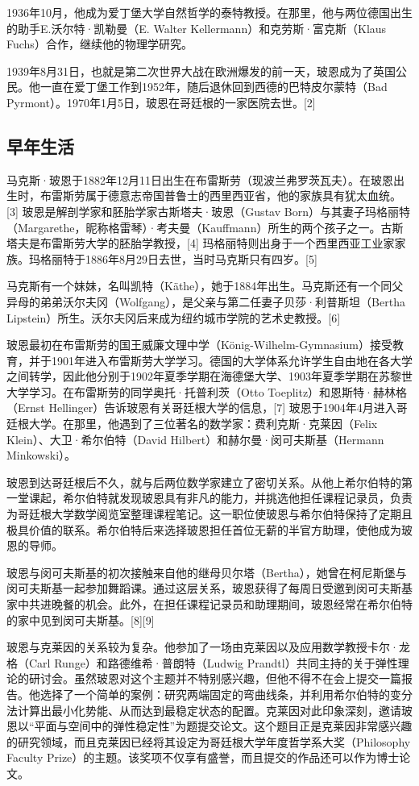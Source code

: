 1936年10月，他成为爱丁堡大学自然哲学的泰特教授。在那里，他与两位德国出生的助手E.沃尔特·凯勒曼（E. Walter Kellermann）和克劳斯·富克斯（Klaus Fuchs）合作，继续他的物理学研究。

1939年8月31日，也就是第二次世界大战在欧洲爆发的前一天，玻恩成为了英国公民。他一直在爱丁堡工作到1952年，随后退休回到西德的巴特皮尔蒙特（Bad Pyrmont）。1970年1月5日，玻恩在哥廷根的一家医院去世。[2]
\subsection{早年生活}  
马克斯·玻恩于1882年12月11日出生在布雷斯劳（现波兰弗罗茨瓦夫）。在玻恩出生时，布雷斯劳属于德意志帝国普鲁士的西里西亚省，他的家族具有犹太血统。[3] 玻恩是解剖学家和胚胎学家古斯塔夫·玻恩（Gustav Born）与其妻子玛格丽特（Margarethe，昵称格雷琴）·考夫曼（Kauffmann）所生的两个孩子之一。古斯塔夫是布雷斯劳大学的胚胎学教授，[4] 玛格丽特则出身于一个西里西亚工业家家族。玛格丽特于1886年8月29日去世，当时马克斯只有四岁。[5]  

马克斯有一个妹妹，名叫凯特（Käthe），她于1884年出生。马克斯还有一个同父异母的弟弟沃尔夫冈（Wolfgang），是父亲与第二任妻子贝莎·利普斯坦（Bertha Lipstein）所生。沃尔夫冈后来成为纽约城市学院的艺术史教授。[6]
 
玻恩最初在布雷斯劳的国王威廉文理中学（König-Wilhelm-Gymnasium）接受教育，并于1901年进入布雷斯劳大学学习。德国的大学体系允许学生自由地在各大学之间转学，因此他分别于1902年夏季学期在海德堡大学、1903年夏季学期在苏黎世大学学习。在布雷斯劳的同学奥托·托普利茨（Otto Toeplitz）和恩斯特·赫林格（Ernst Hellinger）告诉玻恩有关哥廷根大学的信息，[7] 玻恩于1904年4月进入哥廷根大学。在那里，他遇到了三位著名的数学家：费利克斯·克莱因（Felix Klein）、大卫·希尔伯特（David Hilbert）和赫尔曼·闵可夫斯基（Hermann Minkowski）。  

玻恩到达哥廷根后不久，就与后两位数学家建立了密切关系。从他上希尔伯特的第一堂课起，希尔伯特就发现玻恩具有非凡的能力，并挑选他担任课程记录员，负责为哥廷根大学数学阅览室整理课程笔记。这一职位使玻恩与希尔伯特保持了定期且极具价值的联系。希尔伯特后来选择玻恩担任首位无薪的半官方助理，使他成为玻恩的导师。  

玻恩与闵可夫斯基的初次接触来自他的继母贝尔塔（Bertha），她曾在柯尼斯堡与闵可夫斯基一起参加舞蹈课。通过这层关系，玻恩获得了每周日受邀到闵可夫斯基家中共进晚餐的机会。此外，在担任课程记录员和助理期间，玻恩经常在希尔伯特的家中见到闵可夫斯基。[8][9]

玻恩与克莱因的关系较为复杂。他参加了一场由克莱因以及应用数学教授卡尔·龙格（Carl Runge）和路德维希·普朗特（Ludwig Prandtl）共同主持的关于弹性理论的研讨会。虽然玻恩对这个主题并不特别感兴趣，但他不得不在会上提交一篇报告。他选择了一个简单的案例：研究两端固定的弯曲线条，并利用希尔伯特的变分法计算出最小化势能、从而达到最稳定状态的配置。克莱因对此印象深刻，邀请玻恩以“平面与空间中的弹性稳定性”为题提交论文。这个题目正是克莱因非常感兴趣的研究领域，而且克莱因已经将其设定为哥廷根大学年度哲学系大奖（Philosophy Faculty Prize）的主题。该奖项不仅享有盛誉，而且提交的作品还可以作为博士论文。

